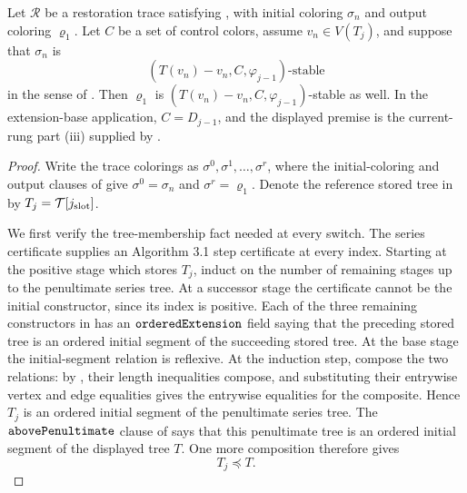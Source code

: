 \begin{lemma}
Let \(\mathcal R\) be a restoration trace satisfying
, with initial coloring
\(\sigma_n\) and output coloring \(\varrho_1\).  Let \(C\) be a set of
control colors, assume \(v_n\in V(T_j)\), and suppose that \(\sigma_n\) is
\[
 (T(v_n)-v_n,C,\varphi_{j-1})\text{-stable}
\]
in the sense of .  Then
\(\varrho_1\) is
\((T(v_n)-v_n,C,\varphi_{j-1})\)-stable as well.  In the extension-base
application, \(C=D_{j-1}\), and the displayed premise is the current-rung
part (iii) supplied by .
\end{lemma}
\begin{proof}
Write the trace colorings as
\(\sigma^0,\sigma^1,\ldots,\sigma^r\), where the initial-coloring and
output clauses of  give
\(\sigma^0=\sigma_n\) and \(\sigma^r=\varrho_1\).  Denote the reference
stored tree in  by
\(T_j=\mathcal T[j_{\rm slot}]\).

We first verify the tree-membership fact needed at every switch.  The
series certificate  supplies an Algorithm 3.1
step certificate at every index.  Starting at the positive stage which
stores \(T_j\), induct on the number of remaining stages up to the
penultimate series tree.  At a successor stage the certificate cannot be
the initial constructor, since its index is positive.  Each of the three
remaining constructors in  has an
\({\tt orderedExtension}\) field saying that the preceding stored tree is
an ordered initial segment of the succeeding stored tree.  At the base
stage the initial-segment relation is reflexive.  At the induction step,
compose the two relations: by
, their length inequalities compose,
and substituting their entrywise vertex and edge equalities gives the
entrywise equalities for the composite.  Hence \(T_j\) is an ordered
initial segment of the penultimate series tree.  The
\({\tt abovePenultimate}\) clause of
 says that this penultimate tree is an
ordered initial segment of the displayed tree \(T\).  One more composition
therefore gives
\[
                         T_j\preceq T.                         \tag{1}
\]


\end{proof}
